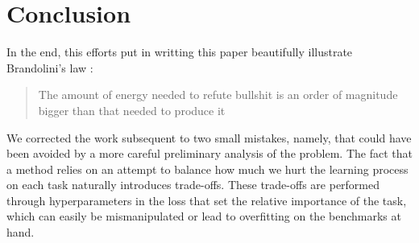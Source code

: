 \documentclass[twocolumn]{article}
\begin{document}
\section{Conclusion}



In the end, this efforts put in writting this paper beautifully illustrate Brandolini's law : 
\begin{quote}
    The amount of energy needed to refute bullshit is an order of magnitude bigger than that needed to produce it
\end{quote}
We corrected the work subsequent to two small mistakes, namely, that could have been avoided by a more careful preliminary analysis of the problem. The fact that a method relies on an attempt to balance how much we hurt the learning process on each task naturally introduces trade-offs. These trade-offs are performed through hyperparameters in the loss that set the relative importance of the task, which can easily be mismanipulated or lead to overfitting on the benchmarks at hand.



\nocite{*}
\printbibliography
\end{document}
